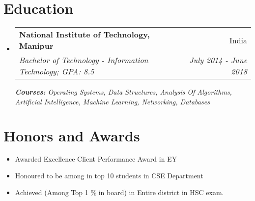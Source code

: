 \documentclass[a4paper,12pt]{article}
\makeatletter
\newcommand{\resumeSubheading}[4]{
  \vspace{-1pt}\item
    \begin{tabular*}{0.97\textwidth}{l@{\extracolsep{\fill}}r}
      \textbf{#1} & #2 \\
      \textit{#3} & \textit{#4} \\
    \end{tabular*}\vspace{-5pt}
}
\newcommand{\resumeSubHeadingListStart}{\begin{itemize}[leftmargin=*]}
\newcommand{\resumeSubHeadingListEnd}{\end{itemize}}
\makeatother
\begin{document}
\section{Education}
  \resumeSubHeadingListStart
    \resumeSubheading
      {National Institute of Technology, Manipur}{India}
      {Bachelor of Technology - Information Technology; GPA: 8.5}{July 2014 - June 2018}
      {\scriptsize \textit{ \footnotesize{\newline{}\textbf{Courses:} Operating Systems, Data Structures, Analysis Of Algorithms, Artificial Intelligence, Machine Learning, Networking, Databases}}}
  \resumeSubHeadingListEnd

\section{Honors and Awards}
\resumeSubHeadingListStart
  \item {Awarded Excellence Client Performance Award in EY}
  \item {Honoured to be among in top 10 students in CSE Department}
  \item {Achieved (Among Top 1 \% in board) in Entire district in HSC exam.}
\resumeSubHeadingListEnd

\end{document}
